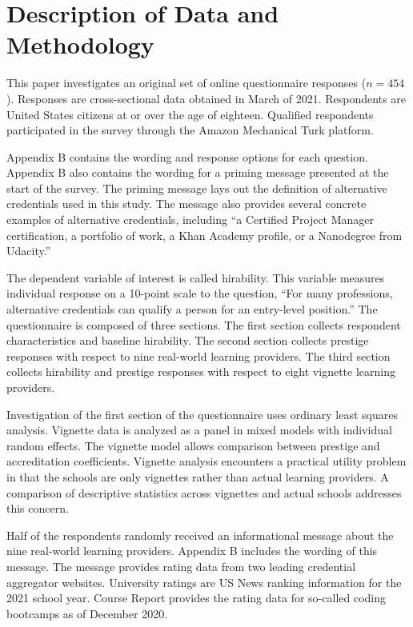 \section{Description of Data and Methodology}

This paper investigates an original set of online questionnaire responses ($n = 454$).
Responses are cross-sectional data obtained in March of 2021.
Respondents are United States citizens at or over the age of eighteen.
Qualified respondents participated in the survey through the Amazon Mechanical Turk platform.

Appendix B contains the wording and response options for each question.
Appendix B also contains the wording for a priming message presented at the start of the survey.
The priming message lays out the definition of alternative credentials used in this study.
The message also provides several concrete examples of alternative credentials,
including ``a Certified Project Manager certification,
a portfolio of work, a Khan Academy profile, or a Nanodegree from Udacity.''

The dependent variable of interest is called hirability.
This variable measures individual response on a 10-point scale to the question,
``For many professions, alternative credentials can qualify a person for an entry-level position.''
The questionnaire is composed of three sections.
The first section collects respondent characteristics and baseline hirability.
The second section collects prestige responses with respect to nine real-world learning providers.
The third section collects hirability and prestige responses with respect to eight vignette learning providers.


Investigation of the first section of the questionnaire uses ordinary least squares analysis.
Vignette data is analyzed as a panel in mixed models with individual random effects.
The vignette model allows comparison between prestige and accreditation coefficients.
Vignette analysis encounters a practical utility problem in that the schools are only vignettes rather than actual learning providers.
A comparison of descriptive statistics across vignettes and actual schools addresses this concern.

Half of the respondents randomly received an informational message about the nine real-world learning providers.
Appendix B includes the wording of this message.
The message provides rating data from two leading credential aggregator websites.
University ratings are US News ranking information for the 2021 school year.
Course Report provides the rating data for so-called coding bootcamps as of December 2020.


